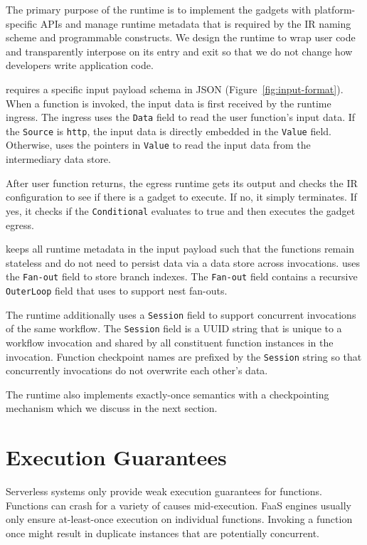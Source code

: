 The primary purpose of the \name{} runtime is to implement the gadgets with
platform-specific APIs and manage runtime metadata that is required by the
\name{} IR naming scheme and programmable constructs. We design the runtime to
wrap user code and transparently interpose on its entry and exit so that we do
not change how developers write application code.

 \name{} requires a specific input payload schema in JSON
(Figure~\ref{fig:input-format}). When a function is invoked, the input data is
first received by the runtime ingress. The ingress uses the \texttt{Data}
field to read the user function's input data. If the \texttt{Source} is
\texttt{http}, the input data is directly embedded in the \texttt{Value}
field. Otherwise, \name{} uses the pointers in \texttt{Value} to read the
input data from the intermediary data store.

After user function returns, the egress runtime gets its output and checks the
IR configuration to see if there is a gadget to execute. If no, it simply
terminates. If yes, it checks if the \texttt{Conditional} evaluates to true
and then executes the gadget egress.

\name{} keeps all runtime metadata in the input payload such that the
functions remain stateless and do not need to persist data via a data store
across invocations. \name{} uses the \texttt{Fan-out} field to store branch
indexes. The \texttt{Fan-out} field contains a recursive \texttt{OuterLoop}
field that \name{} uses to support nest fan-outs.

The runtime additionally uses a \texttt{Session} field to support concurrent
invocations of the same workflow. The \texttt{Session} field is a UUID string
that is unique to a workflow invocation and shared by all constituent function
instances in the invocation. Function checkpoint names are prefixed by the
\texttt{Session} string so that concurrently invocations do not overwrite each
other's data.

The \name{} runtime also implements exactly-once semantics with a
checkpointing mechanism which we discuss in the next section.


\section{Execution Guarantees}

Serverless systems only provide weak execution guarantees for functions.
Functions can crash for a variety of causes mid-execution. FaaS engines
usually only ensure at-least-once execution on individual functions. Invoking
a function once might result in duplicate instances that are potentially
concurrent.

